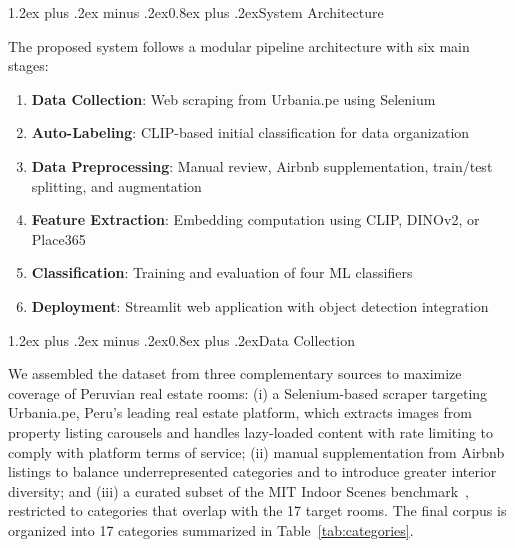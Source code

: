 \documentclass[conference]{IEEEtran}
\makeatletter
\renewcommand{\subsection}{\@startsection{subsection}{2}{\z@}%
  {1.2ex plus .2ex minus .2ex}{0.8ex plus .2ex}{\normalfont\bfseries}}
\makeatother
\begin{document}
\subsection{System Architecture}

The proposed system follows a modular pipeline architecture with six main stages:

\begin{enumerate}
\item \textbf{Data Collection}: Web scraping from Urbania.pe using Selenium
\item \textbf{Auto-Labeling}: CLIP-based initial classification for data organization
\item \textbf{Data Preprocessing}: Manual review, Airbnb supplementation, train/test splitting, and augmentation
\item \textbf{Feature Extraction}: Embedding computation using CLIP, DINOv2, or Place365
\item \textbf{Classification}: Training and evaluation of four ML classifiers
\item \textbf{Deployment}: Streamlit web application with object detection integration
\end{enumerate}

\subsection{Data Collection}

We assembled the dataset from three complementary sources to maximize coverage of Peruvian real estate rooms: (i) a Selenium-based scraper targeting Urbania.pe, Peru's leading real estate platform, which extracts images from property listing carousels and handles lazy-loaded content with rate limiting to comply with platform terms of service; (ii) manual supplementation from Airbnb listings to balance underrepresented categories and to introduce greater interior diversity; and (iii) a curated subset of the MIT Indoor Scenes benchmark~\cite{mit_indoor}, restricted to categories that overlap with the 17 target rooms. The final corpus is organized into 17 categories summarized in Table~\ref{tab:categories}.
\end{document}
